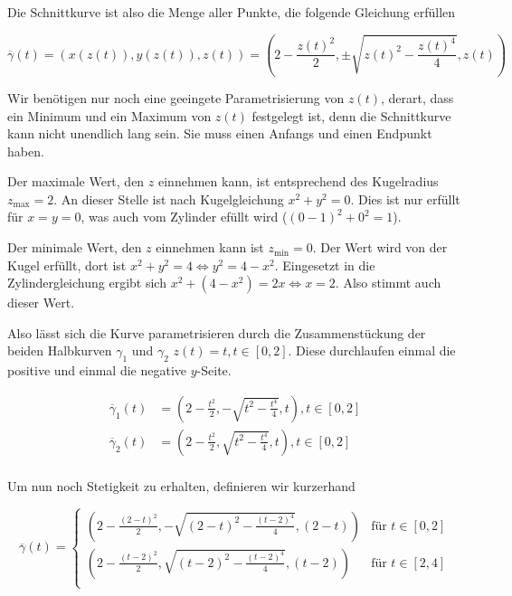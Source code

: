 \documentclass[a4paper,german,12pt,smallheadings]{scrartcl}
\begin{document}
Die Schnittkurve ist also die Menge aller Punkte, die folgende Gleichung erfüllen

\begin{equation*}
  \overline{\gamma}(t) = (x(z(t)), y(z(t)), z(t)) = \left(2 - \frac{z(t)^2}{2}, \pm \sqrt{z(t)^2 - \frac{z(t)^4}{4}}, z(t)\right)
\end{equation*}

Wir benötigen nur noch eine geeingete Parametrisierung von $z(t)$, derart, dass
ein Minimum und ein Maximum von $z(t)$ festgelegt ist, denn die Schnittkurve
kann nicht unendlich lang sein. Sie muss einen Anfangs und einen Endpunkt
haben.

Der maximale Wert, den $z$ einnehmen kann, ist entsprechend des Kugelradius
$z_\text{max}=2$. An dieser Stelle ist nach Kugelgleichung $x^2+y^2=0$. Dies
ist nur erfüllt für $x=y=0$, was auch vom Zylinder efüllt wird ($(0-1)^2 + 0^2
= 1$).

Der minimale Wert, den $z$ einnehmen kann ist $z_\text{min} = 0$. Der Wert wird
von der Kugel erfüllt, dort ist $x^2 + y^2 = 4 \Leftrightarrow y^2 = 4 - x^2$.
Eingesetzt in die Zylindergleichung ergibt sich $x^2 + (4-x^2) = 2x
\Leftrightarrow x = 2$. Also stimmt auch dieser Wert.

Also lässt sich die Kurve parametrisieren durch die Zusammenstückung der beiden
Halbkurven $\gamma_1$ und $\gamma_2$ $z(t) = t, t \in [0,2]$. Diese durchlaufen
einmal die positive und einmal die negative $y$-Seite.

\begin{align*}
  \overline{\gamma}_1(t) &= \left(2 - \frac{t^2}{2}, -\sqrt{t^2 - \frac{t^4}{4}}, t\right), t \in [0,2] \\
  \overline{\gamma}_2(t) &= \left(2 - \frac{t^2}{2}, \sqrt{t^2 - \frac{t^4}{4}}, t\right), t \in [0,2] \\
\end{align*}

Um nun noch Stetigkeit zu erhalten, definieren wir kurzerhand

\begin{equation*}
  \overline{\gamma}(t) =
  \begin{cases}
    \left(2 - \frac{(2-t)^2}{2}, -\sqrt{(2-t)^2 - \frac{(t-2)^4}{4}}, (2-t)\right) &\mbox{für } t \in [0,2]  \\
    \left(2 - \frac{(t-2)^2}{2}, \sqrt{(t-2)^2 - \frac{(t-2)^4}{4}}, (t-2)\right) &\mbox{für } t \in [2,4]  \\
  \end{cases}
\end{equation*}
\end{document}
